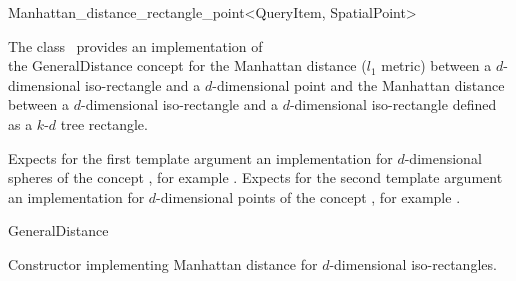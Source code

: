 

\begin{ccRefClass}{Manhattan_distance_rectangle_point<QueryItem, SpatialPoint>}  %


\ccDefinition
  
The class \ccRefName\ provides an implementation of \\
the GeneralDistance concept
for the Manhattan distance ($l_1$ metric)
between a $d$-dimensional iso-rectangle and a $d$-dimensional point 
and the Manhattan distance between a $d$-dimensional iso-rectangle
and a $d$-dimensional iso-rectangle defined as a $k$-$d$ tree rectangle.


\ccParameters

Expects for the first template argument an implementation 
for $d$-dimensional spheres of the concept ,
for example .
Expects for the second template argument
an implementation for
$d$-dimensional points of
the concept , 
for example .

\ccIsModel

GeneralDistance

\ccTypes


\ccCreation
{}  %


{Constructor implementing Manhattan distance for
$d$-dimensional iso-rectangles.}


\end{ccRefClass}
